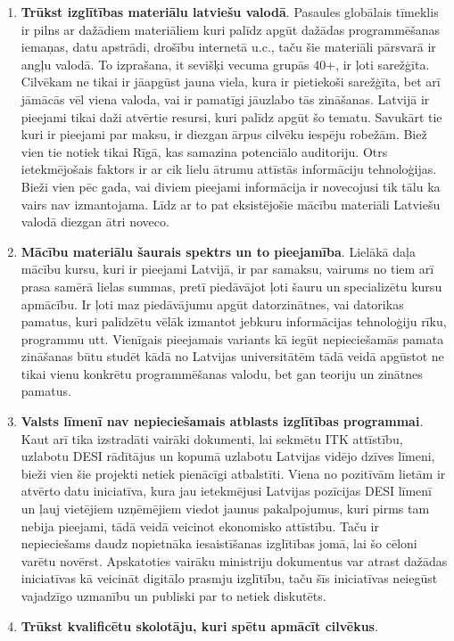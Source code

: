 \begin{enumerate}
    \item \textbf{Trūkst izglītības materiālu latviešu valodā}.
Pasaules globālais tīmeklis ir pilns ar dažādiem materiāliem kuri palīdz apgūt dažādas programmēšanas iemaņas,
datu apstrādi, drošību internetā u.c., taču šie materiāli pārsvarā ir angļu valodā. To izprašana, it sevišķi 
vecuma grupās 40+, ir ļoti sarežģīta. Cilvēkam ne tikai ir jāapgūst jauna viela, kura ir pietiekoši sarežģīta,
bet arī jāmācās vēl viena valoda, vai ir pamatīgi jāuzlabo tās zināšanas. Latvijā ir pieejami tikai daži 
atvērtie resursi, kuri palīdz apgūt šo tematu. Savukārt tie kuri ir pieejami par maksu, ir diezgan ārpus cilvēku
iespēju robežām. Biež vien tie notiek tikai Rīgā, kas samazina potenciālo auditoriju. Otrs ietekmējošais faktors
ir ar cik lielu ātrumu attīstās informāciju tehnoloģijas. Bieži vien pēc gada, vai diviem pieejami informācija
ir novecojusi tik tālu ka vairs nav izmantojama. Līdz ar to pat eksistējošie mācību materiāli Latviešu valodā
diezgan ātri noveco.
    \item \textbf{Mācību materiālu šaurais spektrs un to pieejamība}.
Lielākā daļa mācību kursu, kuri ir pieejami Latvijā, ir par samaksu, vairums no tiem arī prasa samērā lielas
summas, pretī piedāvājot ļoti šauru un specializētu kursu apmācību. Ir ļoti maz piedāvājumu apgūt datorzinātnes,
vai datorikas pamatus, kuri palīdzētu vēlāk izmantot jebkuru informācijas tehnoloģiju rīku, programmu utt.
Vienīgais pieejamais variants kā iegūt nepieciešamās pamata zināšanas būtu studēt kādā no Latvijas universitātēm
tādā veidā apgūstot ne tikai vienu konkrētu programmēšanas valodu, bet gan teoriju un zinātnes pamatus.
    \item \textbf{Valsts līmenī nav nepieciešamais atblasts izglītības programmai}.
Kaut arī tika izstradāti vairāki dokumenti, lai sekmētu ITK attīstību, uzlabotu DESI rādītājus un kopumā uzlabotu
Latvijas vidējo dzīves līmeni, bieži vien šie projekti netiek pienācīgi atbalstīti. Viena no pozitīvām lietām
ir atvērto datu iniciatīva, kura jau ietekmējusi Latvijas pozīcijas DESI līmenī un ļauj vietējiem uzņēmējiem
viedot jaunus pakalpojumus, kuri pirms tam nebija pieejami, tādā veidā veicinot ekonomisko attīstību. Taču ir
nepieciešams daudz nopietnāka iesaistīšanas izglītības jomā, lai šo cēloni varētu novērst. Apskatoties vairāku
ministriju dokumentus var atrast dažādas iniciatīvas kā veicināt digitālo prasmju izglītību, taču šīs iniciatīvas
neiegūst vajadzīgo uzmanību un publiski par to netiek diskutēts.
    \item \textbf{Trūkst kvalificētu skolotāju, kuri spētu apmācīt cilvēkus}.

\end{enumerate}
